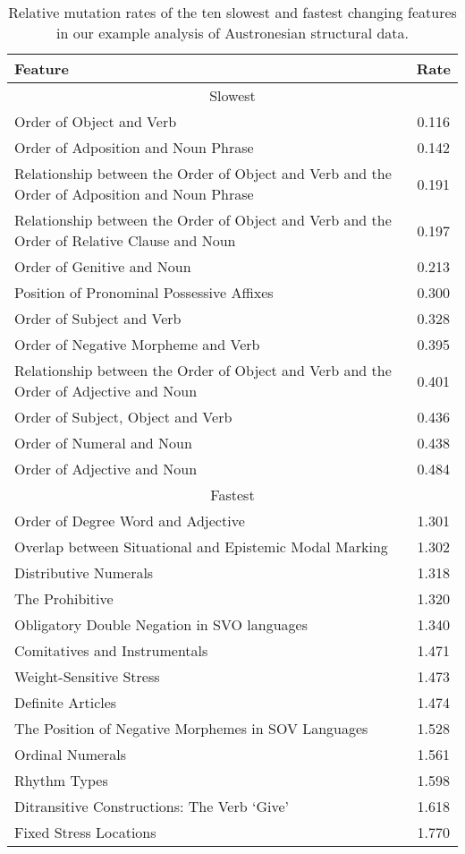 \documentclass[twocolumn,10pt]{scrartcl}
\begin{document}
\begin{table*}[ht]
	\begin{tabular}{|l|c|}
		\hline
		Feature & Rate  \\ \hline
		\multicolumn{2}{|c|}{Slowest} \\ \hline
		Order of Object and Verb & 0.116 \\
		Order of Adposition and Noun Phrase & 0.142 \\
		Relationship between the Order of Object and Verb and the Order of Adposition and Noun Phrase & 0.191 \\
		Relationship between the Order of Object and Verb and the Order of Relative Clause and Noun & 0.197 \\
		Order of Genitive and Noun & 0.213 \\
		Position of Pronominal Possessive Affixes & 0.300 \\
		Order of Subject and Verb & 0.328 \\
		Order of Negative Morpheme and Verb & 0.395 \\
		Relationship between the Order of Object and Verb and the Order of Adjective and Noun &  0.401 \\
Order of Subject, Object and Verb & 0.436 \\
		Order of Numeral and Noun & 0.438 \\
		Order of Adjective and Noun & 0.484 \\ \hline
		\multicolumn{2}{|c|}{Fastest} \\ \hline
		Order of Degree Word and Adjective & 1.301 \\
		Overlap between Situational and Epistemic Modal Marking & 1.302 \\
		Distributive Numerals & 1.318 \\
		The Prohibitive & 1.320 \\
		Obligatory Double Negation in SVO languages & 1.340 \\
		Comitatives and Instrumentals & 1.471 \\
		Weight-Sensitive Stress & 1.473 \\
		Definite Articles & 1.474 \\
		The Position of Negative Morphemes in SOV Languages & 1.528 \\
		Ordinal Numerals & 1.561 \\
		Rhythm Types & 1.598 \\
	   	Ditransitive Constructions: The Verb `Give' & 1.618 \\
		Fixed Stress Locations & 1.770 \\ \hline
	\end{tabular}
	\caption{Relative mutation rates of the ten slowest and fastest changing features in our example analysis of Austronesian structural data.}
\label{tab:austro}
\end{table*}
\end{document}
